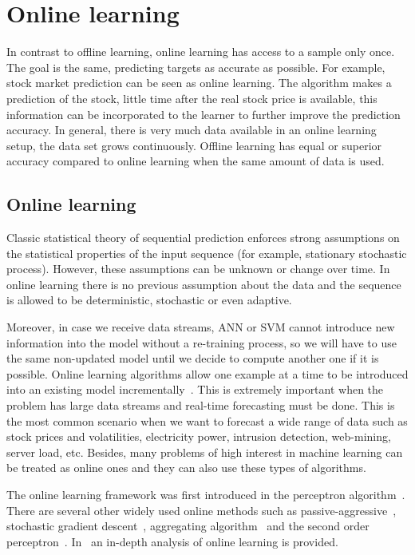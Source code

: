 \section{Online learning} \label{sec:online}

In contrast to offline learning, online learning has access to a sample only once. The goal is the same, predicting targets as accurate as possible. For example, stock market prediction can be seen as online learning. The algorithm makes a prediction of the stock, little time after the real stock price is available, this information can be incorporated to the learner to further improve the prediction accuracy. In general, there is very much data available in an online learning setup, the data set grows continuously. Offline learning has equal or superior accuracy compared to online learning when the same amount of data is used.


\subsection{Online learning}

Classic statistical theory of sequential prediction enforces strong assumptions on the statistical properties of the input sequence (for example, stationary stochastic process). However, these assumptions can be unknown or change over time. In online learning there is no previous assumption about the data and the sequence is allowed to be deterministic, stochastic or even adaptive.  

Moreover, in case we receive data streams, ANN or SVM cannot introduce new information into the model without a re-training process, so we will have to use the same non-updated model until we decide to compute another one if it is possible.  Online learning algorithms allow one example at a time to be introduced into an existing model incrementally~\cite{vovk2005}. This is extremely important when the problem has large data streams and real-time forecasting must be done.  This is the most common scenario when we want to forecast a wide range of data such as stock prices and volatilities, electricity power, intrusion detection, web-mining, server load, etc.  Besides, many problems of high interest in machine learning can be treated as online ones and they can also use these types of algorithms.

The online learning framework was first introduced in the perceptron algorithm~\cite{rosenblatt58}. There are several other widely used online methods such as passive-aggressive~\cite{crammerETall2006}, stochastic gradient descent~\cite{zhang2004}, aggregating algorithm~\cite{vovk2001} and the second order perceptron~\cite{cesa-bianchi2005}.  In~\cite{cesa-bianchi2006} an in-depth analysis of online learning is provided.

